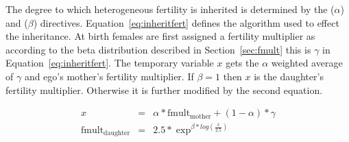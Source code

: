 The degree to which heterogeneous fertility is inherited is determined
by the  ($\alpha$) and  ($\beta$) directives.
Equation~\ref{eq:inheritfert} defines the algorithm used to effect the
inheritance. At birth females are first assigned a fertility
multiplier as according to the beta distribution described in
Section~\ref{sec:fmult} this is $\gamma$ in
Equation~\ref{eq:inheritfert}.  The temporary variable $x$ gets the
$\alpha$ weighted average of $\gamma$ and ego's mother's fertility
multiplier. If $\beta=1$ then $x$ is the daughter's fertility multiplier. Otherwise it is further modified by the second equation.

\begin{eqnarray}
  x &=& \alpha *\mathrm{fmult}_{\mathrm{mother}} + (1-\alpha)*\gamma\\ 
\label{eq:inheritfert}
  \mathrm{fmult}_{\mathrm{daughter}} &=& 2.5* \exp^{\beta*log(\frac{x}{2.5})} 
\end{eqnarray}




